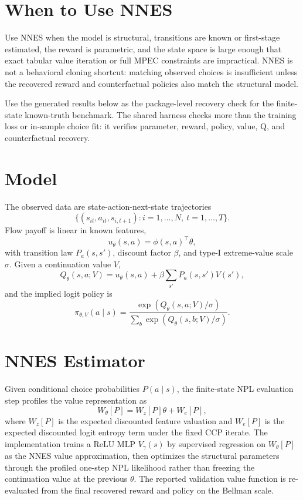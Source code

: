 \documentclass[10pt]{article}
\begin{document}
\section{When to Use NNES}

Use NNES when the model is structural, transitions are known or first-stage
estimated, the reward is parametric, and the state space is large enough that
exact tabular value iteration or full MPEC constraints are impractical. NNES is
not a behavioral cloning shortcut: matching observed choices is insufficient
unless the recovered reward and counterfactual policies also match the
structural model.

Use the generated results below as the package-level recovery check for the
finite-state known-truth benchmark. The shared harness checks more than the
training loss or in-sample choice fit: it verifies parameter, reward, policy,
value, Q, and counterfactual recovery.

\section{Model}

\commonnotation

The observed data are state-action-next-state trajectories
\[
\{(s_{it}, a_{it}, s_{i,t+1}) : i=1,\ldots,N,\ t=1,\ldots,T\}.
\]
Flow payoff is linear in known features,
\[
u_\theta(s,a)=\phi(s,a)^\top\theta,
\]
with transition law \(P_a(s,s')\), discount factor \(\beta\), and type-I
extreme-value scale \(\sigma\). Given a continuation value \(V\),
\[
Q_\theta(s,a;V)=u_\theta(s,a)+\beta\sum_{s'}P_a(s,s')V(s'),
\]
and the implied logit policy is
\[
\pi_{\theta,V}(a\mid s)
=
\frac{\exp(Q_\theta(s,a;V)/\sigma)}
{\sum_b \exp(Q_\theta(s,b;V)/\sigma)}.
\]

\section{NNES Estimator}

Given conditional choice probabilities \(P(a\mid s)\), the finite-state NPL
evaluation step profiles the value representation as
\[
W_\theta[P]=W_z[P]\theta+W_e[P],
\]
where \(W_z[P]\) is the expected discounted feature valuation and \(W_e[P]\)
is the expected discounted logit entropy term under the fixed CCP iterate.
The implementation trains a ReLU MLP \(V_\gamma(s)\) by supervised regression
on \(W_\theta[P]\) as the NNES value approximation, then optimizes the
structural parameters through the profiled one-step NPL likelihood rather than
freezing the continuation value at the previous \(\theta\). The reported
validation value function is re-evaluated from the final recovered reward and
policy on the Bellman scale.
\end{document}
